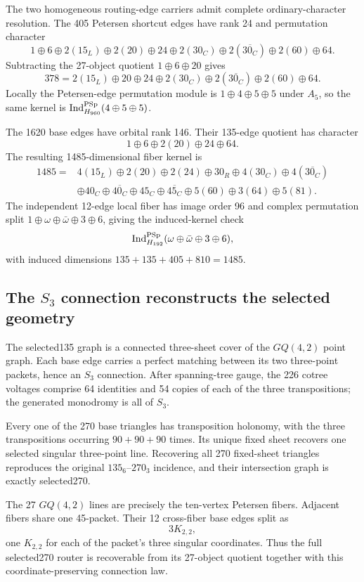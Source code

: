 The two homogeneous routing-edge carriers admit complete ordinary-character
resolution.  The 405 Petersen shortcut edges have rank 24 and permutation
character
\[
 1\oplus 6\oplus2(15_L)\oplus2(20)\oplus24
 \oplus2(30_C)\oplus2(\overline{30_C})\oplus2(60)\oplus64.
\]
Subtracting the 27-object quotient $1\oplus6\oplus20$ gives
\[
 \boxed{378=2(15_L)\oplus20\oplus24\oplus2(30_C)
 \oplus2(\overline{30_C})\oplus2(60)\oplus64.}
\]
Locally the Petersen-edge permutation module is $1\oplus4\oplus5\oplus5$
under $A_5$, so the same kernel is
$\operatorname{Ind}_{H_{960}}^{\mathrm{PSp}}(4\oplus5\oplus5)$.

The 1620 base edges have orbital rank 146.  Their 135-edge quotient has
character
\[
 1\oplus6\oplus2(20)\oplus24\oplus64.
\]
The resulting 1485-dimensional fiber kernel is
\[
\boxed{\begin{aligned}
1485={}&4(15_L)\oplus2(20)\oplus2(24)\oplus30_R
\oplus4(30_C)\oplus4(\overline{30_C})\\
&\oplus40_C\oplus\overline{40_C}
\oplus45_C\oplus\overline{45_C}
\oplus5(60)\oplus3(64)\oplus5(81).
\end{aligned}}
\]
The independent 12-edge local fiber has image order 96 and complex permutation
split $1\oplus\omega\oplus\bar\omega\oplus3\oplus6$, giving the induced-kernel
check
\[
 \operatorname{Ind}_{H_{192}}^{\mathrm{PSp}}
 (\omega\oplus\bar\omega\oplus3\oplus6),
\]
with induced dimensions $135+135+405+810=1485$.

\subsection{The $S_3$ connection reconstructs the selected geometry}

The selected135 graph is a connected three-sheet cover of the
$GQ(4,2)$ point graph.  Each base edge carries a perfect matching between its
two three-point packets, hence an $S_3$ connection.  After spanning-tree gauge,
the 226 cotree voltages comprise 64 identities and 54 copies of each of the
three transpositions; the generated monodromy is all of $S_3$.

Every one of the 270 base triangles has transposition holonomy, with the three
transpositions occurring $90+90+90$ times.  Its unique fixed sheet recovers one
selected singular three-point line.  Recovering all 270 fixed-sheet triangles
reproduces the original $135_6$--$270_3$ incidence, and their intersection graph
is exactly selected270.

The 27 $GQ(4,2)$ lines are precisely the ten-vertex Petersen fibers.  Adjacent
fibers share one 45-packet.  Their 12 cross-fiber base edges split as
\[
 3K_{2,2},
\]
one $K_{2,2}$ for each of the packet's three singular coordinates.  Thus the
full selected270 router is recoverable from its 27-object quotient together
with this coordinate-preserving connection law.

